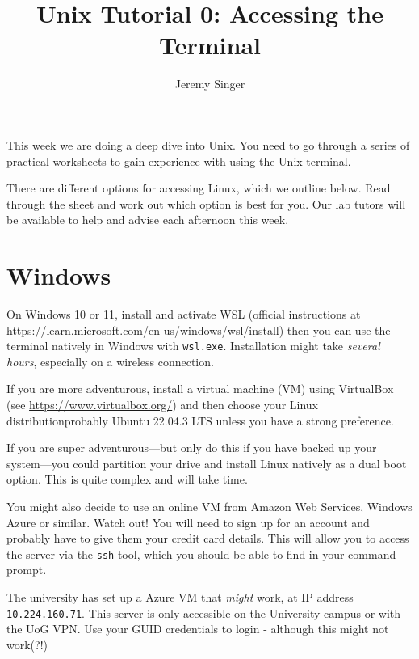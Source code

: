 \documentclass{article}
\begin{document}
\title{Unix Tutorial 0: Accessing the Terminal}
\author{Jeremy Singer}
\date{}
\maketitle





This week we are doing a deep dive into Unix. You need to go
through a series of practical worksheets to gain experience with
using the Unix terminal.

There are different options for accessing Linux, which we outline
below. Read through the sheet and work out which option is best
for you. Our lab tutors will be available to help and advise each
afternoon this week.



\section*{Windows}

On Windows 10 or 11, install and activate WSL (official instructions at \url{https://learn.microsoft.com/en-us/windows/wsl/install}) then you can use the terminal natively in Windows with \texttt{wsl.exe}. Installation might take \emph{several hours}, especially on a wireless connection.

If you are more adventurous, install a virtual machine (VM) using VirtualBox
(see \url{https://www.virtualbox.org/}) and then choose your Linux distributionprobably Ubuntu 22.04.3 LTS unless you have a strong preference.

If you are super adventurous---but only do this if you have backed up your system---you could partition your drive and install Linux natively as a dual boot option. This is quite complex and will take time.

You might also decide to use an online VM from Amazon Web Services, Windows Azure or similar. Watch out! You will need to sign up for an account and probably have to give them your credit card details.
This will allow you to access the server via the \texttt{ssh} tool, which you should be able to find in your command prompt.

The university has set up a Azure VM that \emph{might} work, at IP address
\texttt{10.224.160.71}. This server is only accessible on the University campus or with the UoG VPN.
Use your GUID credentials to login - although this might not work(?!)
\end{document}
